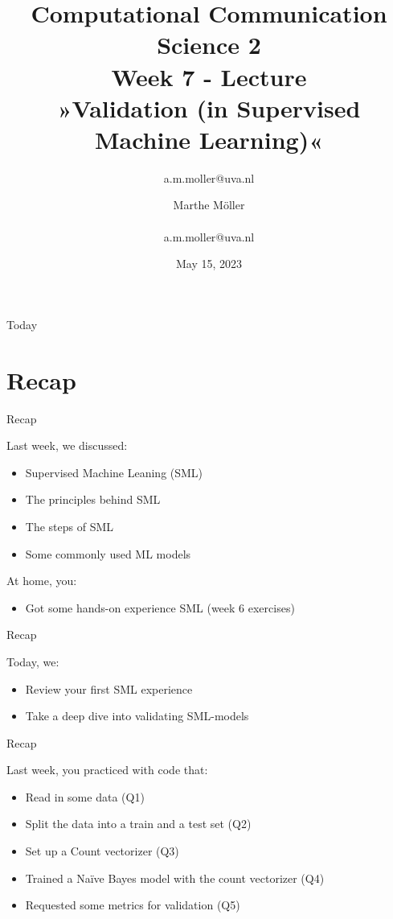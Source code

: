 \documentclass[compress]{beamer}
\title[Computational Communication Science 2]{\textbf{Computational Communication Science 2} \\Week 7 - Lecture\\ »Validation (in Supervised Machine Learning)«}
\author[Marthe Möller]{a.m.moller@uva.nl}\author[A. Marthe Möller]{Marthe Möller \\ ~ \\ \footnotesize{a.m.moller@uva.nl} \\}
\date{May 15, 2023}
\institute[Digital Society Minor, University of Amsterdam]{Digital Society Minor, University of Amsterdam}
\begin{document}
	
	\begin{frame}{}
		\titlepage
	\end{frame}
	
	\begin{frame}{Today}
		\begin{tiny}
			\tableofcontents
		\end{tiny}
	\end{frame}


\section{Recap}

\begin{frame}[fragile]{Recap} 
	
\begin{alertblock}{Last week, we discussed:}
\begin{itemize}
	\item Supervised Machine Leaning (SML)
	\item The principles behind SML
	\item The steps of SML
	\item Some commonly used ML models
\end{itemize}
\end{alertblock}
	
\begin{alertblock}{At home, you:}
\begin{itemize}
	\item Got some hands-on experience SML (week 6 exercises)
\end{itemize}
\end{alertblock}	
\end{frame}


\begin{frame}[fragile]{Recap} 
\begin{alertblock}{Today, we:}
\begin{itemize}
	\item Review your first SML experience
	\item  Take a deep dive into validating SML-models
\end{itemize}
\end{alertblock}
	
\end{frame}


\begin{frame}[fragile]{Recap} 
	
\begin{alertblock}{Last week, you practiced with code that:}
\begin{itemize}
	\item Read in some data (Q1)
 	\item Split the data into a train and a test set (Q2)
	\item Set up a Count vectorizer (Q3)
	\item Trained a Naïve Bayes model with the count vectorizer (Q4)
	\item Requested some metrics for validation (Q5)
\end{itemize}
\end{alertblock}

\end{frame}
\end{document}
